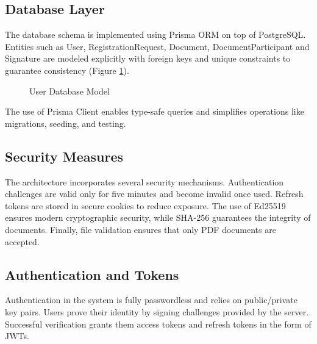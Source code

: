 \subsection{Database Layer}
The database schema is implemented using Prisma ORM on top of PostgreSQL. Entities such as User, RegistrationRequest, Document, DocumentParticipant and Signature are modeled explicitly with foreign keys and unique constraints to guarantee consistency (Figure \ref{user-db-model}). 

\begin{figure}[H]
    \centering
    \caption{User Database Model}
    \label{user-db-model}
\end{figure}

The use of Prisma Client enables type-safe queries and simplifies operations like migrations, seeding, and testing.

\subsection{Security Measures}
The architecture incorporates several security mechanisms. Authentication challenges are valid only for five minutes and become invalid once used. Refresh tokens are stored in secure cookies to reduce exposure. The use of Ed25519 ensures modern cryptographic security, while SHA-256 guarantees the integrity of documents. Finally, file validation ensures that only PDF documents are accepted.

\subsection{Authentication and Tokens}
Authentication in the system is fully passwordless and relies on public/private key pairs. Users prove their identity by signing challenges provided by the server. Successful verification grants them access tokens and refresh tokens in the form of JWTs.

